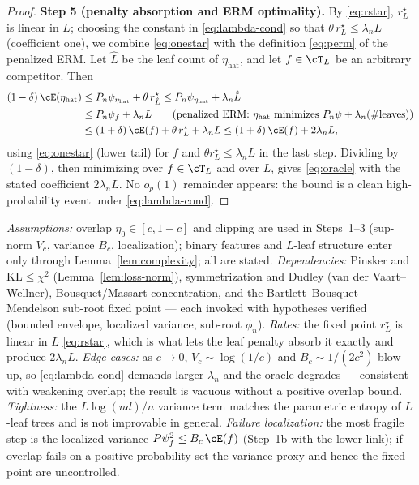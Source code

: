 \begin{proof}
\smallskip\noindent\textbf{Step 5 (penalty absorption and ERM optimality).}
By \eqref{eq:rstar}, $r^\star_L$ is linear in $L$; choosing the constant in
\eqref{eq:lambda-cond} so that $\theta\, r^\star_L \le \lambda_n L$ (coefficient
one), we combine \eqref{eq:onestar} with the definition \eqref{eq:perm} of the
penalized ERM. Let $\hat L$ be the leaf count of $\eta_{\text{hat}}$, and let
$f \in \cT_L$ be an arbitrary competitor. Then
\begin{align*}
  (1-\delta)\,\cE(\eta_{\text{hat}})
  &\le P_n\psi_{\eta_{\text{hat}}} + \theta\, r^\star_{\hat L}
     \le P_n\psi_{\eta_{\text{hat}}} + \lambda_n \hat L \\
  &\le P_n\psi_f + \lambda_n L
     \qquad\text{(penalized ERM: $\eta_{\text{hat}}$ minimizes $P_n\psi + \lambda_n(\#\text{leaves})$)}\\
  &\le (1+\delta)\,\cE(f) + \theta\, r^\star_L + \lambda_n L
     \le (1+\delta)\,\cE(f) + 2\lambda_n L,
\end{align*}
using \eqref{eq:onestar} (lower tail) for $f$ and
$\theta r^\star_L \le \lambda_n L$ in the last step. Dividing by $(1-\delta)$,
then minimizing over $f \in \cT_L$ and over $L$, gives \eqref{eq:oracle} with
the stated coefficient $2\lambda_n L$. No $o_p(1)$ remainder appears: the bound
is a clean high-probability event under \eqref{eq:lambda-cond}.
\end{proof}

\begin{remark}
\emph{Assumptions:} overlap $\eta_0 \in [c,1-c]$ and clipping are used in
Steps~1--3 (sup-norm $V_c$, variance $B_c$, localization); binary features and
$L$-leaf structure enter only through Lemma~\ref{lem:complexity}; all are
stated. \emph{Dependencies:} Pinsker and $\mathrm{KL}\le\chi^2$
(Lemma~\ref{lem:loss-norm}), symmetrization and Dudley (van der
Vaart--Wellner), Bousquet/Massart concentration, and the
Bartlett--Bousquet--Mendelson sub-root fixed point --- each invoked with
hypotheses verified (bounded envelope, localized variance, sub-root
$\phi_n$). \emph{Rates:} the fixed point $r^\star_L$ is linear in $L$
\eqref{eq:rstar}, which is what lets the leaf penalty absorb it exactly and
produce $2\lambda_n L$. \emph{Edge cases:} as $c \to 0$, $V_c \sim \log(1/c)$
and $B_c \sim 1/(2c^2)$ blow up, so \eqref{eq:lambda-cond} demands larger
$\lambda_n$ and the oracle degrades --- consistent with weakening overlap; the
result is vacuous without a positive overlap bound. \emph{Tightness:} the
$L\log(nd)/n$ variance term matches the parametric entropy of $L$-leaf trees and
is not improvable in general. \emph{Failure localization:} the most fragile
step is the localized variance $P\psi_f^2 \le B_c\,\cE(f)$ (Step~1b with the
lower link); if overlap fails on a positive-probability set the variance proxy
and hence the fixed point are uncontrolled.
\end{remark}

